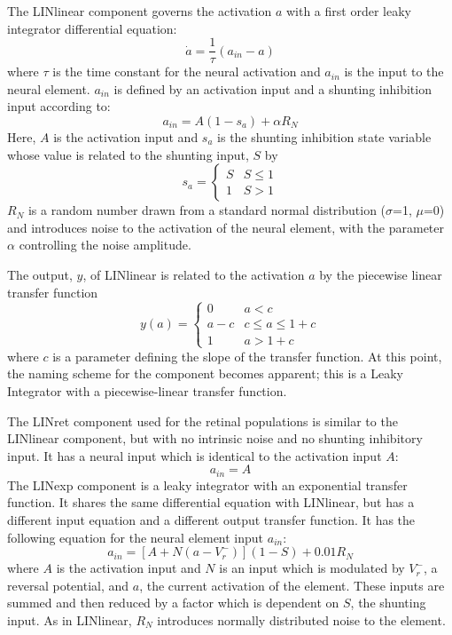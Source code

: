 \documentclass{frontiersSCNS}
\begin{document}
The LINlinear component governs the activation $a$ with a first order
leaky integrator differential equation:
\begin{equation}
   \dot{a} = \frac{1}{\tau}(a_{in}-a)
\end{equation}
where $\tau$ is the time constant for the neural activation and
$a_{in}$ is the input to the neural element. $a_{in}$ is defined by an
activation input and a shunting inhibition input according to:
\begin{equation}
   a_{in} = A(1-s_a)+\alpha R_N
\end{equation}
Here, $A$ is the activation input and $s_a$ is the shunting inhibition
state variable whose value is related to the shunting input, $S$ by
\begin{equation}
   s_a = \begin{cases}
      S & S\leq 1 \\
      1 & S > 1
   \end{cases}
\end{equation}
$R_N$ is a random number drawn from a standard normal distribution
($\sigma$=1, $\mu$=0) and introduces noise to the activation of the
neural element, with the parameter $\alpha$ controlling the noise
amplitude.

The output, $y$, of LINlinear is related to the activation $a$ by the
piecewise linear transfer function
\begin{equation}
   y(a) = \begin{cases}
      0   & a < c \\
      a-c & c \leq a \leq 1+c \\
      1   & a > 1+c
   \end{cases}
\end{equation}
where $c$ is a parameter defining the slope of the transfer
function. At this point, the naming scheme for the component becomes
apparent; this is a Leaky Integrator with a piecewise-linear transfer function.

The LINret component used for the retinal populations is similar
to the LINlinear component, but with no intrinsic noise and no
shunting inhibitory input. It has a neural input which is identical to
the activation input $A$:
\begin{equation}
   a_{in} = A
\end{equation}
The LINexp component is a leaky integrator with an exponential
transfer function. It shares the same differential equation with
LINlinear, but has a different input equation and a different output
transfer function. It has the following equation for the neural
element input $a_{in}$:
\begin{equation}
   a_{in} = [A+N(a-V_{r}^{-})] (1-S) + 0.01 R_N
\end{equation}
where $A$ is the activation input and $N$ is an input which is
modulated by $V_{r}^{-}$, a reversal potential, and $a$, the current
activation of the element. These inputs are summed and then reduced by
a factor which is dependent on $S$, the shunting input. As in
LINlinear, $R_N$ introduces normally distributed noise to the element.
\end{document}
